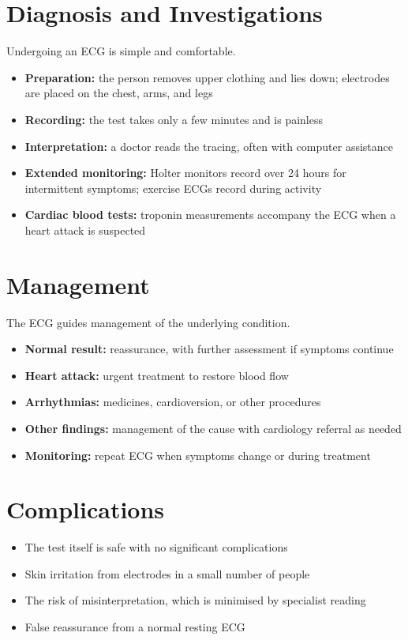 \section*{Diagnosis and Investigations}
Undergoing an ECG is simple and comfortable.
\begin{itemize}
    \item \textbf{Preparation:} the person removes upper clothing and lies down; electrodes are placed on the chest, arms, and legs
    \item \textbf{Recording:} the test takes only a few minutes and is painless
    \item \textbf{Interpretation:} a doctor reads the tracing, often with computer assistance
    \item \textbf{Extended monitoring:} Holter monitors record over 24 hours for intermittent symptoms; exercise ECGs record during activity
    \item \textbf{Cardiac blood tests:} troponin measurements accompany the ECG when a heart attack is suspected
\end{itemize}

\section*{Management}
The ECG guides management of the underlying condition.
\begin{itemize}
    \item \textbf{Normal result:} reassurance, with further assessment if symptoms continue
    \item \textbf{Heart attack:} urgent treatment to restore blood flow
    \item \textbf{Arrhythmias:} medicines, cardioversion, or other procedures
    \item \textbf{Other findings:} management of the cause with cardiology referral as needed
    \item \textbf{Monitoring:} repeat ECG when symptoms change or during treatment
\end{itemize}

\section*{Complications}
\begin{itemize}
    \item The test itself is safe with no significant complications
    \item Skin irritation from electrodes in a small number of people
    \item The risk of misinterpretation, which is minimised by specialist reading
    \item False reassurance from a normal resting ECG
\end{itemize}

